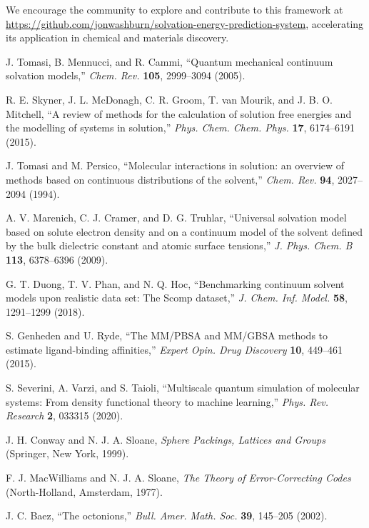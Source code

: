 \documentclass[twocolumn,prd,amsmath,amssymb,aps,superscriptaddress,nofootinbib]{revtex4-2}
\begin{document}
We encourage the community to explore and contribute to this framework at \url{https://github.com/jonwashburn/solvation-energy-prediction-system}, accelerating its application in chemical and materials discovery.

\begin{thebibliography}{50}

 J. Tomasi, B. Mennucci, and R. Cammi, ``Quantum mechanical continuum solvation models,'' \textit{Chem. Rev.} \textbf{105}, 2999--3094 (2005).

 R. E. Skyner, J. L. McDonagh, C. R. Groom, T. van Mourik, and J. B. O. Mitchell, ``A review of methods for the calculation of solution free energies and the modelling of systems in solution,'' \textit{Phys. Chem. Chem. Phys.} \textbf{17}, 6174--6191 (2015).

 J. Tomasi and M. Persico, ``Molecular interactions in solution: an overview of methods based on continuous distributions of the solvent,'' \textit{Chem. Rev.} \textbf{94}, 2027--2094 (1994).

 A. V. Marenich, C. J. Cramer, and D. G. Truhlar, ``Universal solvation model based on solute electron density and on a continuum model of the solvent defined by the bulk dielectric constant and atomic surface tensions,'' \textit{J. Phys. Chem. B} \textbf{113}, 6378--6396 (2009).

 G. T. Duong, T. V. Phan, and N. Q. Hoc, ``Benchmarking continuum solvent models upon realistic data set: The Scomp dataset,'' \textit{J. Chem. Inf. Model.} \textbf{58}, 1291--1299 (2018).

 S. Genheden and U. Ryde, ``The MM/PBSA and MM/GBSA methods to estimate ligand-binding affinities,'' \textit{Expert Opin. Drug Discovery} \textbf{10}, 449--461 (2015).

 S. Severini, A. Varzi, and S. Taioli, ``Multiscale quantum simulation of molecular systems: From density functional theory to machine learning,'' \textit{Phys. Rev. Research} \textbf{2}, 033315 (2020).

 J. H. Conway and N. J. A. Sloane, \textit{Sphere Packings, Lattices and Groups} (Springer, New York, 1999).

 F. J. MacWilliams and N. J. A. Sloane, \textit{The Theory of Error-Correcting Codes} (North-Holland, Amsterdam, 1977).

 J. C. Baez, ``The octonions,'' \textit{Bull. Amer. Math. Soc.} \textbf{39}, 145--205 (2002).


\end{thebibliography}
\end{document}
